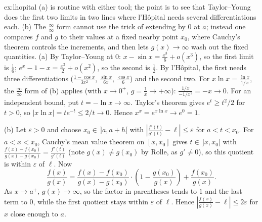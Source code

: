 \begin{solution}{ex:lhopital}
\idea (a) is routine with either tool; the point is to see that Taylor--Young does the first two limits in two lines where l'H\^opital needs several differentiations each. (b) The $\frac\infty\infty$ form cannot use the trick of extending by $0$ at $a$; instead one compares $f$ and $g$ to their values at a fixed nearby point $x_0$, where Cauchy's theorem controls the increments, and then lets $g(x)\to\infty$ wash out the fixed quantities.
\writeup (a) By Taylor--Young at $0$: $x-\sin x=\frac{x^3}6+o(x^3)$, so the first limit is $\frac16$; $e^x-1-x=\frac{x^2}2+o(x^2)$, so the second is $\frac12$. By l'H\^opital, the first needs three differentiations ($\frac{1-\cos x}{3x^2}$, $\frac{\sin x}{6x}$, $\frac{\cos x}6$) and the second two. For $x\ln x=\frac{\ln x}{1/x}$, the $\frac\infty\infty$ form of (b) applies (with $x\to0^+$, $g=\frac1x\to+\infty$): $\frac{1/x}{-1/x^2}=-x\to0$. For an independent bound, put $t=-\ln x\to\infty$. Taylor's theorem gives
$e^t\ge t^2/2$ for $t>0$, so $|x\ln x|=te^{-t}\le2/t\to0$.
Hence $x^x=e^{x\ln x}\to e^0=1$.

(b) Let $\varepsilon>0$ and choose $x_0\in\,]a,a+h[$ with $\left|\frac{f'(t)}{g'(t)}-\ell\right|\le\varepsilon$ for $a<t<x_0$. For $a<x<x_0$, Cauchy's mean value theorem on $[x,x_0]$ gives $t\in\,]x,x_0[$ with $\frac{f(x)-f(x_0)}{g(x)-g(x_0)}=\frac{f'(t)}{g'(t)}$ (note $g(x)\ne g(x_0)$ by Rolle, as $g'\ne0$), so this quotient is within $\varepsilon$ of $\ell$. Now
\[
\frac{f(x)}{g(x)}=\frac{f(x)-f(x_0)}{g(x)-g(x_0)}\cdot\left(1-\frac{g(x_0)}{g(x)}\right)+\frac{f(x_0)}{g(x)}.
\]
As $x\to a^+$, $g(x)\to\infty$, so the factor in parentheses tends to $1$ and the last term to $0$, while the first quotient stays within $\varepsilon$ of $\ell$. Hence $\left|\frac{f(x)}{g(x)}-\ell\right|\le2\varepsilon$ for $x$ close enough to $a$.
\end{solution}

